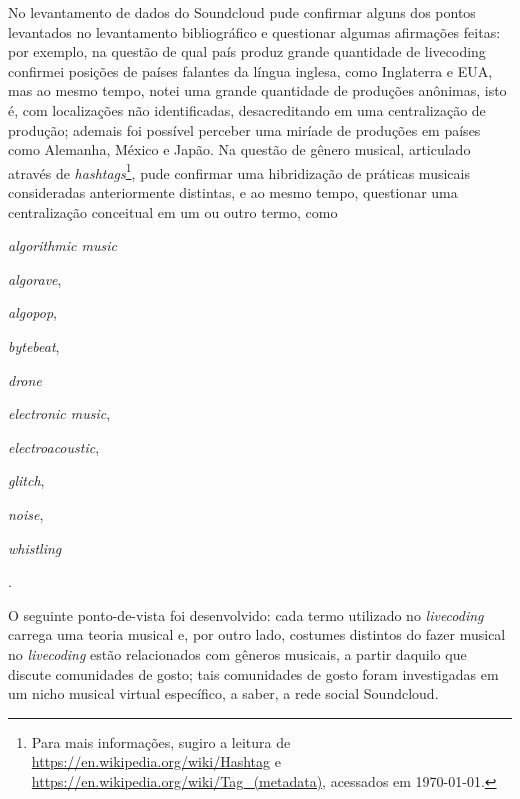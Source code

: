 No levantamento de dados do Soundcloud pude confirmar alguns dos pontos levantados no levantamento bibliográfico e questionar algumas afirmações feitas: por exemplo, na questão de qual país produz grande quantidade de livecoding confirmei posições de países falantes da língua inglesa, como Inglaterra e EUA, mas ao mesmo tempo, notei uma grande quantidade de produções anônimas, isto é, com localizações não identificadas, desacreditando em uma centralização de produção; ademais foi possível perceber uma miríade de produções em países como Alemanha, México e Japão. Na questão de gênero musical, articulado através de \emph{hashtags}\footnote{Para mais informações, sugiro a leitura de \url{https://en.wikipedia.org/wiki/Hashtag} e \url{https://en.wikipedia.org/wiki/Tag_(metadata)}, acessados em \today.}, pude confirmar uma hibridização de práticas musicais consideradas anteriormente distintas, e ao mesmo tempo, questionar uma centralização conceitual em um ou outro termo, como \begin{inparaenum}
\item \emph{algorithmic music}
\item \emph{algorave},
\item \emph{algopop},
\item \emph{bytebeat},
\item \emph{drone}
\item \emph{electronic music},
\item \emph{electroacoustic},
\item \emph{glitch},
\item \emph{noise},
\item \emph{whistling}
\end{inparaenum}.

O seguinte ponto-de-vista foi desenvolvido: cada termo utilizado no \emph{livecoding} carrega uma teoria musical e, por outro lado, costumes distintos do fazer musical no \emph{livecoding} estão relacionados com gêneros musicais, a partir  daquilo que  discute comunidades de gosto; tais comunidades de gosto foram investigadas em um nicho musical virtual específico, a saber, a rede social Soundcloud. 

